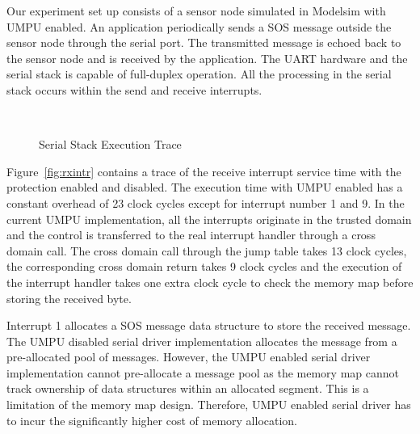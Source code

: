 Our experiment set up consists of a sensor node simulated in Modelsim
with UMPU enabled.
%
An application periodically sends a SOS message outside the
sensor node through the serial port.
%
The transmitted message is echoed back to the sensor node and is
received by the application.
%
The UART hardware and the serial stack is capable of full-duplex
operation.
%
All the processing in the serial stack occurs within the send and
receive interrupts.
%
%
\begin{figure}[htpb]
  \label{fig:intrtrace}
  \centering
  \mbox{
    \hspace{0.5in}
  }
  \caption{Serial Stack Execution Trace}
\end{figure}   
%

Figure~\ref{fig:rxintr} contains a trace of the receive interrupt
service time with the protection enabled and disabled.
%
The execution time with UMPU enabled has a constant overhead of 23 clock
cycles except for interrupt number 1 and 9.
%
In the current UMPU implementation, all the interrupts originate in
the trusted domain and the control is transferred to the real
interrupt handler through a cross domain call.
%
The cross domain call through the jump table takes 13 clock cycles,
the corresponding cross domain return takes 9 clock cycles and the
execution of the interrupt handler takes one extra clock cycle to
check the memory map before storing the received byte.
%

Interrupt 1 allocates a SOS message data structure to store the
received message.
%
The UMPU disabled serial driver implementation allocates the message
from a pre-allocated pool of messages.
%
However, the UMPU enabled serial driver implementation cannot
pre-allocate a message pool as the memory map cannot track ownership
of data structures within an allocated segment.
%
This is a limitation of the memory map design.
%
Therefore, UMPU enabled serial driver has to incur the significantly
higher cost of memory allocation.
%

